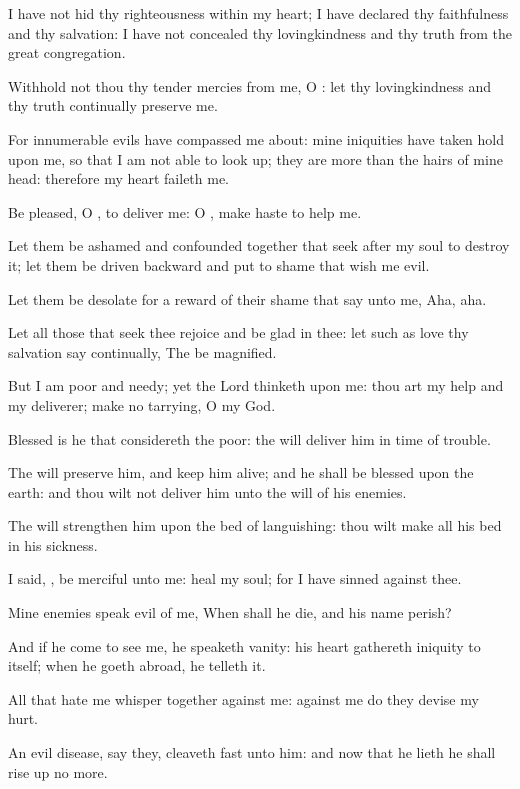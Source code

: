 \Verse I have not hid thy righteousness within my heart; I have declared thy faithfulness and thy salvation: I have not concealed thy lovingkindness and thy truth from the great congregation.

\Verse Withhold not thou thy tender mercies from me, O \LORD: let thy lovingkindness and thy truth continually preserve me.

\Verse For innumerable evils have compassed me about: mine iniquities have taken hold upon me, so that I am not able to look up; they are more than the hairs of mine head: therefore my heart faileth me.

\Verse Be pleased, O \LORD, to deliver me: O \LORD, make haste to help me.

\Verse Let them be ashamed and confounded together that seek after my soul to destroy it; let them be driven backward and put to shame that wish me evil.

\Verse Let them be desolate for a reward of their shame that say unto me, Aha, aha.

\Verse Let all those that seek thee rejoice and be glad in thee: let such as love thy salvation say continually, The \LORD be magnified.

\Verse But I am poor and needy; yet the Lord thinketh upon me: thou art my help and my deliverer; make no tarrying, O my God.




\Chapter
\Verse Blessed is he that considereth the poor: the \LORD will deliver him in time of trouble.

\Verse The \LORD will preserve him, and keep him alive; and he shall be blessed upon the earth: and thou wilt not deliver him unto the will of his enemies.

\Verse The \LORD will strengthen him upon the bed of languishing: thou wilt make all his bed in his sickness.

\Verse I said, \LORD, be merciful unto me: heal my soul; for I have sinned against thee.

\Verse Mine enemies speak evil of me, When shall he die, and his name perish?

\Verse And if he come to see me, he speaketh vanity: his heart gathereth iniquity to itself; when he goeth abroad, he telleth it.

\Verse All that hate me whisper together against me: against me do they devise my hurt.

\Verse An evil disease, say they, cleaveth fast unto him: and now that he lieth he shall rise up no more.

